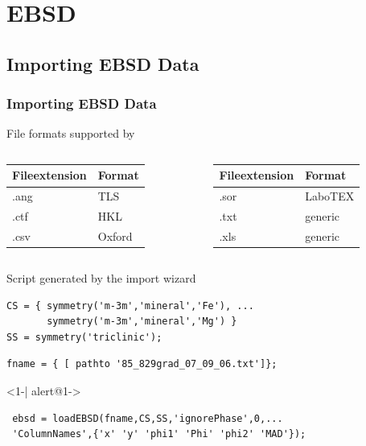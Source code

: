 \section{EBSD}


\subsection*{Importing EBSD Data}

\begin{frame}[fragile]
  \frametitle{Importing EBSD Data}

  File formats supported by \MTEX

  \medskip

  \begin{columns}
    \begin{column}{5cm}
      \begin{tabular}{ll}
        Fileextension & Format \\
        \toprule
        .ang& TLS \\
        .ctf& HKL \\
        .csv& Oxford
      \end{tabular}

    \end{column}
    \begin{column}{5cm}
      \begin{tabular}{ll}
        Fileextension & Format \\
        \toprule
        .sor& LaboTEX \\
        .txt & generic\\
        .xls & generic
      \end{tabular}
    \end{column}
  \end{columns}

  \pause

  \bigskip

  Script generated by the import wizard

\begin{lstlisting}
CS = { symmetry('m-3m','mineral','Fe'), ...
       symmetry('m-3m','mineral','Mg') }
SS = symmetry('triclinic');
\end{lstlisting}

\begin{lstlisting}
fname = { [ pathto '85_829grad_07_09_06.txt']};
\end{lstlisting}

\begin{actionenv}<1-| alert@1->
\begin{lstlisting}
 ebsd = loadEBSD(fname,CS,SS,'ignorePhase',0,...
 'ColumnNames',{'x' 'y' 'phi1' 'Phi' 'phi2' 'MAD'});
\end{lstlisting}
\end{actionenv}

\end{frame}


